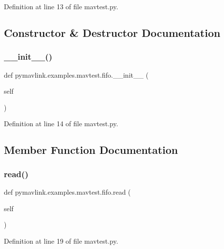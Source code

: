 Definition at line 13 of file mavtest.\+py.



\subsection{Constructor \& Destructor Documentation}
\mbox{\label{classpymavlink_1_1examples_1_1mavtest_1_1fifo_a6db7ec373a08745bb51fdd54cef6c60e}} 
\subsubsection{\texorpdfstring{\_\_init\_\_()}{\_\_init\_\_()}}
{\footnotesize\ttfamily def pymavlink.\+examples.\+mavtest.\+fifo.\+\_\+\+\_\+init\+\_\+\+\_\+ (\begin{DoxyParamCaption}\item[{}]{self }\end{DoxyParamCaption})}



Definition at line 14 of file mavtest.\+py.



\subsection{Member Function Documentation}
\mbox{\label{classpymavlink_1_1examples_1_1mavtest_1_1fifo_ab683588c70db38e0fc2fd97780d1f063}} 
\subsubsection{\texorpdfstring{read()}{read()}}
{\footnotesize\ttfamily def pymavlink.\+examples.\+mavtest.\+fifo.\+read (\begin{DoxyParamCaption}\item[{}]{self }\end{DoxyParamCaption})}



Definition at line 19 of file mavtest.\+py.

